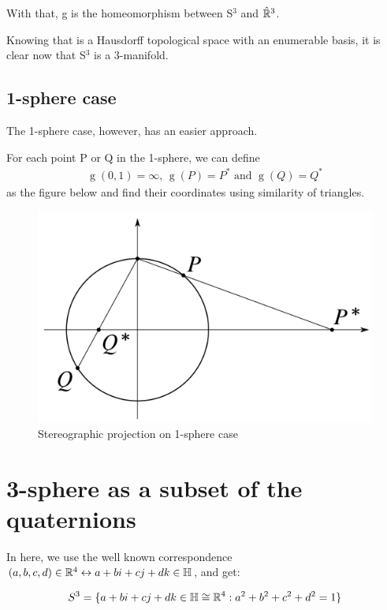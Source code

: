 With that, g is the homeomorphism between S$^3$ and $\hat{\mathbb{R}}^3$.

Knowing that is a Hausdorff topological space with an enumerable basis, it is clear now that S$^3$ is a 3-manifold.

\subsection{1-sphere case}
The 1-sphere case, however, has an easier approach.

For each point P or Q in the 1-sphere, we can define 
\begin{align*}
    \operatorname{g}(0, 1) = \infty\mbox{, }\operatorname{g}(P) = P^*\mbox{ and }\operatorname{g}(Q) = Q^* 
\end{align*}
as the figure below and find their coordinates using similarity of triangles.

\begin{figure}[H]
    \centering
    \includegraphics[scale=0.35]{projCirculo.png}
    \caption{Stereographic projection on 1-sphere case}
    \label{fig:projcirc}
\end{figure}

\section{3-sphere as a subset of the quaternions}
In here, we use the well known correspondence $(a,b,c,d) \in \mathbb{R}^4 \leftrightarrow a+bi+cj+dk \in \mathbb{H}$, and get:

\begin{equation*}
    S^{3} = \{a + bi+ cj + dk \in \mathbb{H} \cong \mathbb{R}^{4} : a^{2} + b^{2} + c^{2} + d^{2} = 1\}
\end{equation*}

